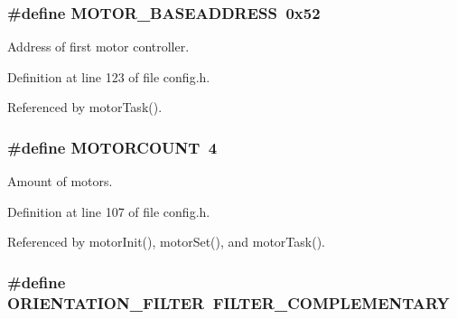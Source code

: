 \hypertarget{group__config_ga6e8ab18bbb1ef1b1e929c627f18224a3}{
\subsubsection[{M\-O\-T\-O\-R\-\_\-\-B\-A\-S\-E\-A\-D\-D\-R\-E\-S\-S}]{\setlength{\rightskip}{0pt plus 5cm}\#define M\-O\-T\-O\-R\-\_\-\-B\-A\-S\-E\-A\-D\-D\-R\-E\-S\-S~0x52}}\label{group__config_ga6e8ab18bbb1ef1b1e929c627f18224a3}


Address of first motor controller. 



Definition at line 123 of file config.\-h.



Referenced by motor\-Task().

\hypertarget{group__config_ga1a2c496f8bb7dbb5f1dfef5c32624a6d}{
\subsubsection[{M\-O\-T\-O\-R\-C\-O\-U\-N\-T}]{\setlength{\rightskip}{0pt plus 5cm}\#define M\-O\-T\-O\-R\-C\-O\-U\-N\-T~4}}\label{group__config_ga1a2c496f8bb7dbb5f1dfef5c32624a6d}


Amount of motors. 



Definition at line 107 of file config.\-h.



Referenced by motor\-Init(), motor\-Set(), and motor\-Task().

\hypertarget{group__config_gaf45c761b3bd949068c77712e21259564}{
\subsubsection[{O\-R\-I\-E\-N\-T\-A\-T\-I\-O\-N\-\_\-\-F\-I\-L\-T\-E\-R}]{\setlength{\rightskip}{0pt plus 5cm}\#define O\-R\-I\-E\-N\-T\-A\-T\-I\-O\-N\-\_\-\-F\-I\-L\-T\-E\-R~F\-I\-L\-T\-E\-R\-\_\-\-C\-O\-M\-P\-L\-E\-M\-E\-N\-T\-A\-R\-Y}}\label{group__config_gaf45c761b3bd949068c77712e21259564}


